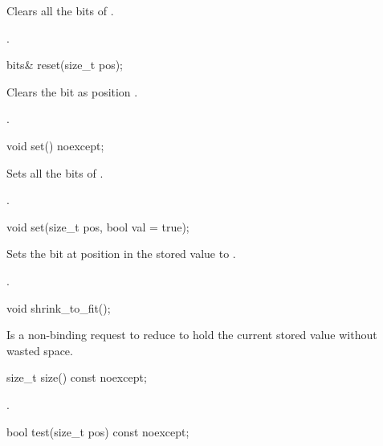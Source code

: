 \begin{addedblock}
\begin{itemdescr}
\effects Clears all the bits of .

\returns {}.	
\end{itemdescr}

\begin{itemdecl}
bits& reset(size_t pos);	
\end{itemdecl}

\begin{itemdescr}
\effects Clears the bit as position .

\returns {}. 	
\end{itemdescr}

\begin{itemdecl}
void set() noexcept;	
\end{itemdecl}

\begin{itemdescr}
\effects Sets all the bits of .

.	
\end{itemdescr}

\begin{itemdecl}
void set(size_t pos, bool val = true);	
\end{itemdecl}

\begin{itemdescr}
\effects Sets the bit at position  in the stored value to .

\returns {}.
\end{itemdescr}

\begin{itemdecl}
void shrink_to_fit();	
\end{itemdecl}

\begin{itemdescr}
\effects Is a non-binding request to reduce  to hold the current stored value without wasted space.
\end{itemdescr}

\begin{itemdecl}
size_t size() const noexcept;	
\end{itemdecl}

\begin{itemdescr}
\returns {}.
\end{itemdescr}

\begin{itemdecl}
bool test(size_t pos) const noexcept;	
\end{itemdecl}


\end{addedblock}
